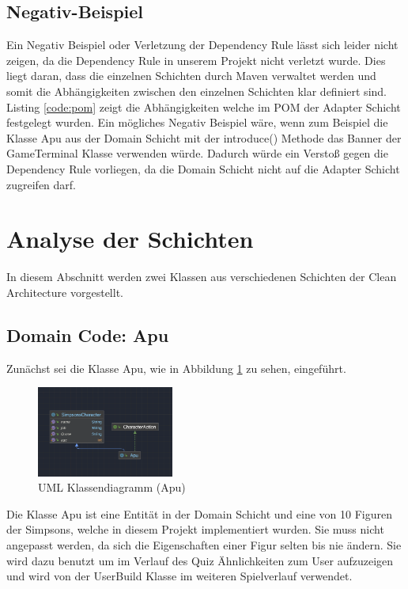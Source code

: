 \subsection{Negativ-Beispiel}
Ein Negativ Beispiel oder Verletzung der Dependency Rule lässt sich leider nicht zeigen, da die Dependency Rule in unserem Projekt nicht verletzt wurde. Dies liegt daran, dass die einzelnen Schichten durch Maven verwaltet werden und somit die Abhängigkeiten zwischen den einzelnen Schichten klar definiert sind. Listing \ref{code:pom} zeigt die Abhängigkeiten welche im \ac{POM} der Adapter Schicht festgelegt wurden.\newline
Ein mögliches Negativ Beispiel wäre, wenn zum Beispiel die Klasse Apu aus der Domain Schicht mit der introduce() Methode das Banner der GameTerminal Klasse verwenden würde. Dadurch würde ein Verstoß gegen die Dependency Rule vorliegen, da die Domain Schicht nicht auf die Adapter Schicht zugreifen darf. 


\newpage
\section{Analyse der Schichten}
In diesem Abschnitt werden zwei Klassen aus verschiedenen Schichten der Clean Architecture vorgestellt. 
\subsection{Domain Code: Apu}
Zunächst sei die Klasse Apu, wie in Abbildung \ref{fig:Apu} zu sehen, eingeführt.
\begin{figure}[ht]
    \centering
    \includegraphics[width=0.4\textwidth]{Bilder/Apu.png}
    \caption{UML Klassendiagramm (Apu)}
    \label{fig:Apu}
\end{figure}
Die Klasse Apu ist eine Entität in der Domain Schicht und eine von 10 Figuren der Simpsons, welche in diesem Projekt implementiert wurden. Sie muss nicht angepasst werden, da sich die Eigenschaften einer Figur selten bis nie ändern. Sie wird dazu benutzt um im Verlauf des Quiz Ähnlichkeiten zum User aufzuzeigen und wird von der UserBuild Klasse im weiteren Spielverlauf verwendet.
\newpage
